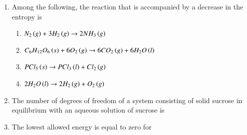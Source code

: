 \documentclass[journal,12pt,onecolumn]{IEEEtran}
\theoremstyle{remark}
\begin{document}
\begin{enumerate}
\begin{enumerate}
        \hfill{}
    \end{enumerate}



\item Among the following, the reaction that is accompanied by a decrease in the entropy is
    \begin{enumerate}
   
         \item $N_2\left(g\right) + 3H_2\left(g\right) \rightarrow 2NH_3\left(g\right)$
        \item $C_6H_{12}O_6\left(s\right) + 6O_2\left(g\right) \rightarrow 6CO_2\left(g\right) + 6H_2O\left(l\right)$
        \item $PCl_5\left(s\right) \rightarrow PCl_3\left(l\right) + Cl_2\left(g\right)$
        \item $2H_2O\left(l\right) \rightarrow 2H_2\left(g\right) + O_2\left(g\right)$
        \hfill{}
    \end{enumerate}



\item The number of degrees of freedom of a system consisting of solid sucrose in equilibrium with an aqueous solution of sucrose is
    \begin{enumerate}
        \hfill{}
    \end{enumerate}



\item The lowest allowed energy is equal to zero for
    \begin{enumerate}
\end{enumerate}
\end{enumerate}
\end{document}
